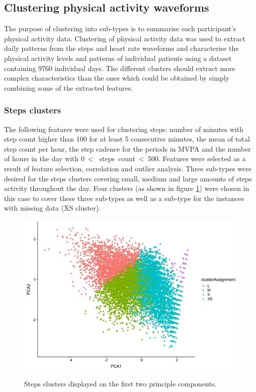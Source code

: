 \documentclass{article}
\begin{document}
\subsection{Clustering physical activity waveforms} 

The purpose of clustering into sub-types is to summarise each participant's physical activity data. Clustering of physical activity data was used to extract daily patterns from the steps and heart rate waveforms and characterise the physical activity levels and patterns of individual patients using a dataset containing 9760 individual days. The different clusters should extract more complex characteristics than the ones which could be obtained by simply combining some of the extracted features.

\subsubsection{Steps clusters}

The following features were used for clustering steps: number of minutes with step count higher than 100 for at least 5 consecutive minutes, the mean of total step count per hour, the step cadence for the periods in MVPA and the number of hours in the day with 0~< ~steps~count~<~500. Features were selected as a result of feature selection, correlation and outlier analysis. Three sub-types were desired for the steps clusters covering small, medium and large amounts of steps activity throughout the day. Four clusters (as shown in figure \ref{fig:stepsClusters}) were chosen in this case to cover these three sub-types as well as a sub-type for the instances with missing data (XS cluster). 

\begin{figure}[htb]
  \centering
  \caption{Steps clusters displayed on the first two principle components.}
  \includegraphics[]{stepsClusters.png}
  \label{fig:stepsClusters}
\end{figure}
\end{document}
